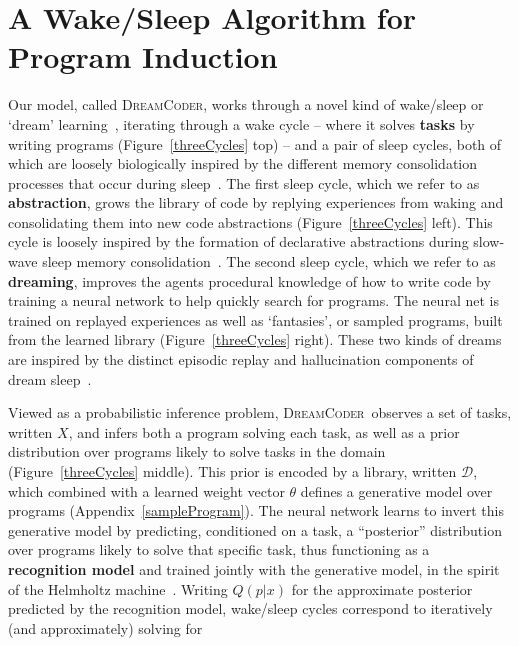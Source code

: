 \documentclass{article}
\newcommand{\system}{\textsc{DreamCoder}~}
\newcommand{\systemEnding}{\textsc{DreamCoder}}
\begin{document}



\section{A Wake/Sleep Algorithm for Program Induction}\label{overviewSection}

Our model, called \systemEnding, works through a novel kind
of wake/sleep or `dream' learning~\cite{hinton1995wake}, iterating
through a wake cycle -- where it solves \textbf{tasks} by writing programs (Figure~\ref{threeCycles} top)
-- and a pair of sleep cycles, both of which are loosely biologically
inspired by the different memory consolidation processes that occur during sleep~\cite{rasch2013sleep}. The first sleep cycle, which we refer to as
\textbf{abstraction}, grows the library of code by replying
experiences from waking and consolidating them into new code
abstractions (Figure~\ref{threeCycles} left).  This cycle is loosely inspired by the formation of declarative abstractions
during slow-wave sleep memory consolidation~\cite{DUDAI201520}.  The second
sleep cycle, which we refer to as \textbf{dreaming}, improves the
agents procedural knowledge of how to write code by training a neural network to
help quickly search for programs. The neural net is trained on replayed
experiences as well as `fantasies', or sampled programs, built from the learned
library (Figure~\ref{threeCycles} right).  These two kinds of dreams are inspired by the distinct
episodic replay and hallucination components of dream
sleep~\cite{fosse2003dreaming}.

Viewed as a probabilistic inference problem, \system observes a set of
tasks, written $X$, and infers both a program solving each task, as
well as a prior distribution over programs likely to solve tasks in
the domain (Figure~\ref{threeCycles} middle). This prior is encoded by
a library, written $\mathcal{D}$, which combined with a
learned weight vector $\theta$
defines a generative model over programs
(Appendix~\ref{sampleProgram}).  The neural network learns to invert
this generative model by predicting, conditioned on a task, a
``posterior'' distribution over programs likely to solve that specific
task,
thus functioning as a \textbf{recognition model} and trained jointly with the generative model, in the spirit of the Helmholtz machine~\cite{hinton1995wake}.
Writing $Q(p|x)$ for the approximate
posterior predicted by the recognition model, wake/sleep cycles correspond to iteratively (and
approximately) solving for
\end{document}
